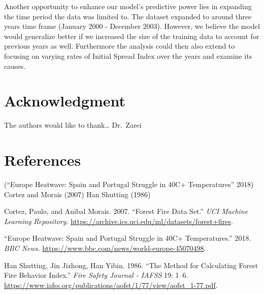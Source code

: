 \documentclass[conference,final,]{IEEEtran}
\begin{document}
Another opportunity to enhance our model's predictive power lies in
expanding the time period the data was limited to. The dataset expanded
to around three years time frame (January 2000 - December 2003).
However, we believe the model would generalize better if we increased
the size of the training data to account for previous years as well.
Furthermore the analysis could then also extend to focusing on varying
rates of Initial Spread Index over the years and examine its causes.

\hypertarget{acknowledgment}{%
\section{Acknowledgment}\label{acknowledgment}}

The authors would like to thank\ldots{} Dr.~Zarei

\newpage

\hypertarget{references}{%
\section{References}\label{references}}

(``Europe Heatwave: Spain and Portugal Struggle in 40C+ Temperatures''
2018) Cortez and Morais (2007) Han Shutting (1986)

\hypertarget{refs}{}
\leavevmode\hypertarget{ref-Cortez}{}%
Cortez, Paulo, and Anibal Morais. 2007. ``Forest Fire Data Set.''
\emph{UCI Machine Learning Repository}.
\url{https://archive.ics.uci.edu/ml/datasets/forest+fires}.

\leavevmode\hypertarget{ref-bbc}{}%
``Europe Heatwave: Spain and Portugal Struggle in 40C+ Temperatures.''
2018. \emph{BBC News}.
\url{https://www.bbc.com/news/world-europe-45070498}.

\leavevmode\hypertarget{ref-Shutting}{}%
Han Shutting, Jin Jizhong, Han Yibin. 1986. ``The Method for Calculating
Forest Fire Behavior Index.'' \emph{Fire Safety Journal - IAFSS} 19:
1--6.
\url{https://www.iafss.org/publications/aofst/1/77/view/aofst_1-77.pdf}.
\end{document}
